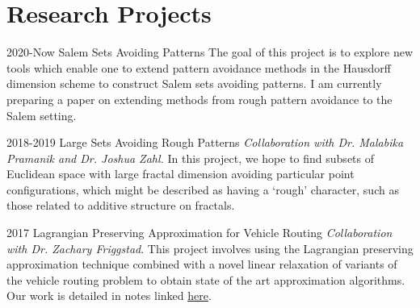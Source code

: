 \documentclass[a4paper]{cv-friggeri}
\begin{document}

\section{Research Projects}

\begin{entrylist}


\entry
{2020-Now}
{Salem Sets Avoiding Patterns}
{}
{The goal of this project is to explore new tools which enable one to extend pattern avoidance methods in the Hausdorff dimension scheme to construct Salem sets avoiding patterns. I am currently preparing a paper on extending methods from rough pattern avoidance to the Salem setting.}


\entry
{2018-2019}
{Large Sets Avoiding Rough Patterns}
{}
{\emph{Collaboration with Dr. Malabika Pramanik and Dr. Joshua Zahl.} In this project, we hope to find subsets of Euclidean space with large fractal dimension avoiding particular point configurations, which might be described as having a `rough' character, such as those related to additive structure on fractals.}


\entry
{2017}
{Lagrangian Preserving Approximation for Vehicle Routing}
{}
{\emph{Collaboration with Dr. Zachary Friggstad}. This project involves using the Lagrangian preserving approximation technique combined with a novel linear relaxation of variants of the vehicle routing problem to obtain state of the art approximation algorithms. Our work is detailed in notes linked \href{https://github.com/jdjake/Notes/raw/master/Research/VehicleRouting/VehicleRouting.pdf}{here}.}




\end{entrylist}
\end{document}
